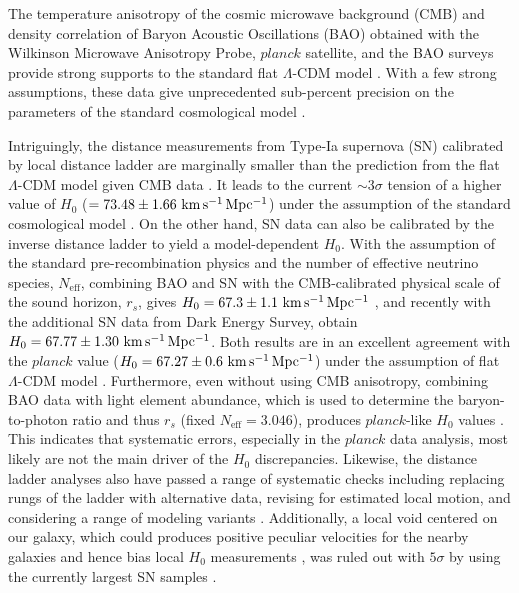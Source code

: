 \documentclass[useAMS,usenatbib]{mnras}
\def\planck{\textit{planck}}
\def\kmsmpc{\rm km\,s^{-1}\,Mpc^{-1}}
\begin{document}
The temperature anisotropy of the cosmic microwave background (CMB) and density correlation of Baryon Acoustic Oscillations (BAO) obtained with the Wilkinson Microwave Anisotropy Probe, $\planck$ satellite, and the BAO surveys provide strong supports to the standard flat $\Lambda$-CDM model \citep[e.g.,][]{KomatsuEtal11,HinshawEtal13,planck18parameter}. With a few strong assumptions, these data give unprecedented sub-percent precision on the parameters of the standard cosmological model
 \citep[e.g.,][]{AndersonEtal14,KazinEtal14,RossEtal15}.

Intriguingly, the distance measurements from Type-Ia supernova (SN) calibrated by local distance ladder are marginally smaller than the prediction from the flat $\Lambda$-CDM model given CMB data \citep[see Fig. 4 in][]{CuestaEtal15}. 
It leads to the current $\sim 3\sigma$ tension of a higher value of $H_{0}$ ($=73.48\pm1.66~\kmsmpc$) under the assumption of the standard cosmological model \citep{RiessEtal18c}. 
On the other hand, SN data can also be calibrated by the inverse distance ladder to yield a model-dependent $H_{0}$.
With the assumption of the standard pre-recombination physics and the number of effective neutrino species, $N_{\textrm{eff}}$, combining BAO and SN with the CMB-calibrated physical scale of the sound horizon, $r_{s}$, gives $H_{0} =67.3\pm1.1~\kmsmpc$ \citep{AuborugEtal15}, and recently with the additional SN data from Dark Energy Survey, \citet{MacaulayEtal18} obtain $H_{0} =67.77\pm1.30~\kmsmpc$. Both results are in an excellent agreement with the $\planck$ value ($H_{0} = 67.27\pm0.6~\kmsmpc$) under the assumption of flat $\Lambda$-CDM model \citep{planck18parameter}. Furthermore, even without using CMB anisotropy, combining BAO data with light element abundance, which is used to determine the baryon-to-photon ratio and thus $r_{s}$ (fixed $N_{\textrm{eff}}=3.046$), produces $\planck$-like $H_{0}$ values \citep{AddisonEtal18}. This indicates that systematic errors, especially in the $\planck$ data analysis, most likely are not the main driver of the $H_{0}$ discrepancies. 
 Likewise, the distance ladder analyses also have passed a range of systematic checks including replacing rungs of the ladder with alternative data, revising for estimated local motion, and considering a range of modeling variants
 \citep[e.g.,][]{Efstathiou14,CardonaEtal17,ZhangEtal17,FollinKonx18,FeeneyEtal18,DhawanEtal18}. 
 Additionally, a local void centered on our galaxy, which could produces positive peculiar velocities for the nearby galaxies and hence bias local $H_{0}$ measurements \citep{KeenanEtal13,FleuryEtal17,ShanksEtal19}, was ruled out with $5\sigma$ by using the currently largest SN samples \citep{KenworthyEtal19}.
\end{document}
